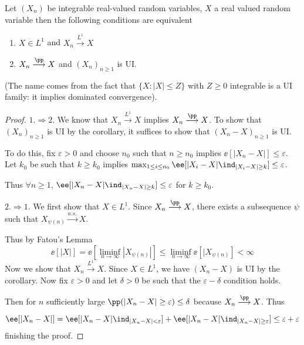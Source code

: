 \documentclass[../main.tex]{subfiles}
\begin{document}
\begin{theorem}
  Let $(X_n)$ be integrable real-valued random variables, $X$ a real valued
  random variable then the following conditions are equivalent
  \begin{enumerate}
    \item $X \in L^1$ and $X_n \overset{L^1}{\longrightarrow} X$
    \item $X_n \overset{\pp}{\longrightarrow} X$ and $(X_n)_{n \geq 1}$ is UI.
  \end{enumerate}
\end{theorem}
(The name comes from the fact that $\{ X \colon |X| \leq Z \} $ with $Z \geq 0$
integrable is a UI family: it implies dominated convergence).

\begin{proof}
  $\boxed{1. \Rightarrow 2.}$ We know that  $X_n \overset{L^1}{\longrightarrow}
  X$ implies $X_n \overset{\pp}{\longrightarrow}X$. To show that $(X_n)_{n \geq
  1}$ is UI by the corollary, it suffices to show that $(X_n - X)_{n \geq 1}$ is
  UI.
  \vspace{0.4em}

  \noindent
  To do this, fix $\varepsilon>0$ and choose $n_0$ such that $n \geq n_0$
  implies $\ee[|X_n - X|] \leq \varepsilon$. Let $k_0$ be such that $k \geq k_0$
  implies $\max _{1 \leq i \leq n_0} \ee[|X_i - X| \ind_{|X_i - X| \geq k}] \leq
  \varepsilon$.

  \vspace{0.4em}
  \noindent
  Thus $\forall n \geq 1$, $\ee[|X_n - X| \ind_{|X_n - X| \geq k}] \leq
  \varepsilon$ for $k \geq k_0$.

  \vspace{1em}
  \noindent
  $\boxed{2. \Rightarrow 1.}$ We first show that $X \in L^1$. Since $X_n
  \overset{\pp}{\longrightarrow} X$, there exists a subsequence $\psi$ such
  that $X_{\psi(n)} \overset{a.s.}{\longrightarrow} X$.

  \vspace{0.4em}
  \noindent
  Thus by Fatou's Lemma 
  \[
    \ee[|X|] = \ee[\liminf_{n \to \infty} |X_{\psi(n)}|] \leq \liminf_{n \to
    \infty} \ee[|X_{\psi(n)}] < \infty
  \] 
  Now we show that $X_n \overset{L^1}{\longrightarrow} X$. Since $X \in L^1$, we
  have $(X_n - X)$ is UI by the corollary. Now fix $\varepsilon > 0$ and let
  $\delta > 0$ be such that the $\varepsilon-\delta$ condition holds.

  \vspace{0.4em}
  \noindent
  Then for $n$ sufficiently large $\pp(|X_n - X| \geq \varepsilon) \leq \delta$
  because $X_n \overset{\pp}{\longrightarrow} X$. Thus

  \[
    \ee[|X_n - X|] = \ee[|X_n - X|\ind_{|X_n - X| < \varepsilon }] + 
    \ee[|X_n - X|\ind_{|X_n - X| \geq \varepsilon }]
    \leq \varepsilon + \varepsilon
  \] 
  finishing the proof.
\end{proof}
\end{document}
